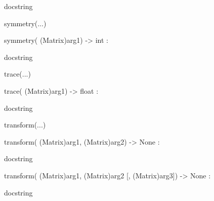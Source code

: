 \documentclass[letterpaper,10pt,english]{sphinxmanual}
\begin{document}
\begin{description}
\begin{description}
\begin{DUlineblock}{0em}
\begin{DUlineblock}{\DUlineblockindent}
\item[]
\begin{DUlineblock}{\DUlineblockindent}
\item[] docstring
\item[] 
\end{DUlineblock}
\end{DUlineblock}
\item[] symmetry(...)
\item[]
\begin{DUlineblock}{\DUlineblockindent}
\item[] symmetry( (Matrix)arg1) -\textgreater{} int :
\item[]
\begin{DUlineblock}{\DUlineblockindent}
\item[] docstring
\item[] 
\end{DUlineblock}
\end{DUlineblock}
\item[] trace(...)
\item[]
\begin{DUlineblock}{\DUlineblockindent}
\item[] trace( (Matrix)arg1) -\textgreater{} float :
\item[]
\begin{DUlineblock}{\DUlineblockindent}
\item[] docstring
\item[] 
\end{DUlineblock}
\end{DUlineblock}
\item[] transform(...)
\item[]
\begin{DUlineblock}{\DUlineblockindent}
\item[] transform( (Matrix)arg1, (Matrix)arg2) -\textgreater{} None :
\item[]
\begin{DUlineblock}{\DUlineblockindent}
\item[] docstring
\item[] 
\end{DUlineblock}
\item[] transform( (Matrix)arg1, (Matrix)arg2 {[}, (Matrix)arg3{]}) -\textgreater{} None :
\item[]
\begin{DUlineblock}{\DUlineblockindent}
\item[] docstring
\item[] 
\end{DUlineblock}

\end{DUlineblock}
\end{DUlineblock}
\end{description}
\end{description}
\end{document}
